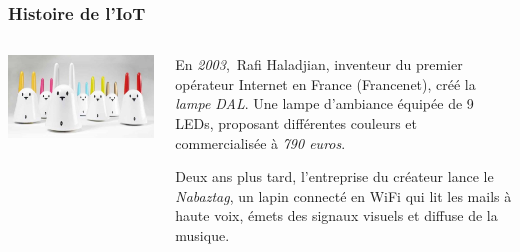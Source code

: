 \documentclass[aspectratio=169,utf8]{beamer}
\begin{document}
\begin{frame}
  \frametitle{Histoire de l'IoT}
  \begin{columns}
    \begin{column}{.3\textwidth}
      \includegraphics[width=\textwidth]{nabaztag.jpg}
    \end{column}
    \begin{column}{.7\textwidth}
      En \emph{2003}, Rafi Haladjian, inventeur du premier opérateur Internet en France (Francenet), créé la \emph{lampe DAL}. Une lampe d’ambiance équipée de 9 LEDs, proposant différentes couleurs et commercialisée à \emph{790 euros}.

      Deux ans plus tard, l’entreprise du créateur lance le \emph{Nabaztag}, un lapin connecté en WiFi qui lit les mails à haute voix, émets des signaux visuels et diffuse de la musique.
    \end{column}
  \end{columns}
\end{frame}
\end{document}
